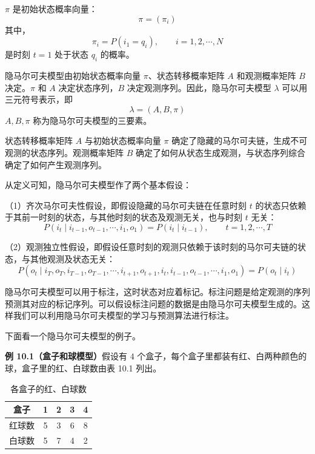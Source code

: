 \documentclass[UTF8, 12pt, fontset=fandol, oneside]{ctexart}
\begin{document}
$\pi$ 是初始状态概率向量：
\begin{equation}
  \pi=(\pi_i)
  \tag{10.5}
\end{equation}
其中，
\begin{equation}
  \pi_i=P(i_1=q_i),\qquad i=1,2,\cdots,N
  \tag{10.6}
\end{equation}
是时刻 $t=1$ 处于状态 $q_i$ 的概率。

隐马尔可夫模型由初始状态概率向量 $\pi$、状态转移概率矩阵 $A$ 和观测概率矩阵 $B$ 决定。$\pi$ 和 $A$ 决定状态序列，$B$ 决定观测序列。因此，隐马尔可夫模型 $\lambda$ 可以用三元符号表示，即
\begin{equation}
  \lambda=(A,B,\pi)
  \tag{10.7}
\end{equation}
$A,B,\pi$ 称为隐马尔可夫模型的三要素。

状态转移概率矩阵 $A$ 与初始状态概率向量 $\pi$ 确定了隐藏的马尔可夫链，生成不可观测的状态序列。观测概率矩阵 $B$ 确定了如何从状态生成观测，与状态序列综合确定了如何产生观测序列。

从定义可知，隐马尔可夫模型作了两个基本假设：

（1）齐次马尔可夫性假设，即假设隐藏的马尔可夫链在任意时刻 $t$ 的状态只依赖于其前一时刻的状态，与其他时刻的状态及观测无关，也与时刻 $t$ 无关：
\begin{equation}
  P(i_t\mid i_{t-1},o_{t-1},\cdots,i_1,o_1)=P(i_t\mid i_{t-1}),\qquad t=1,2,\cdots,T
  \tag{10.8}
\end{equation}

（2）观测独立性假设，即假设任意时刻的观测只依赖于该时刻的马尔可夫链的状态，与其他观测及状态无关：
\begin{equation}
  P(o_t\mid i_T,o_T,i_{T-1},o_{T-1},\cdots,i_{t+1},o_{t+1},i_t,i_{t-1},o_{t-1},\cdots,i_1,o_1)=P(o_t\mid i_t)
  \tag{10.9}
\end{equation}

隐马尔可夫模型可以用于标注，这时状态对应着标记。标注问题是给定观测的序列预测其对应的标记序列。可以假设标注问题的数据是由隐马尔可夫模型生成的。这样我们可以利用隐马尔可夫模型的学习与预测算法进行标注。

下面看一个隐马尔可夫模型的例子。

\noindent\textbf{例 10.1（盒子和球模型）}\quad 假设有 $4$ 个盒子，每个盒子里都装有红、白两种颜色的球，盒子里的红、白球数由表 10.1 列出。

\begin{table}[htbp]
  \centering
  \caption{各盒子的红、白球数}
  \begin{tabular}{c|cccc}
    \toprule
    盒子 & 1 & 2 & 3 & 4\\
    \midrule
    红球数 & 5 & 3 & 6 & 8\\
    白球数 & 5 & 7 & 4 & 2\\
    \bottomrule
  \end{tabular}
\end{table}
\end{document}
